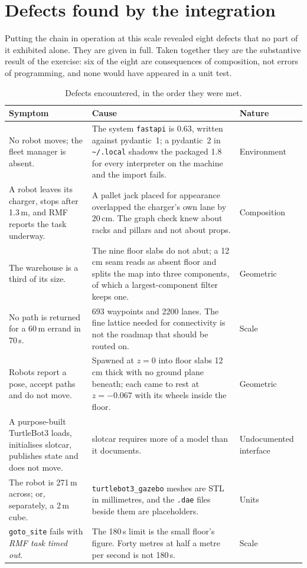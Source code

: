 \documentclass[11pt,a4paper]{article}
\theoremstyle{definition}
\newcommand{\code}[1]{\texttt{\small #1}}
\begin{document}
\section{Defects found by the integration}
\label{sec:defects}

Putting the chain in operation at this scale revealed eight defects that no
part of it exhibited alone. They are given in full. Taken together they are the substantive result of the exercise: six of the eight are consequences of composition, not errors of programming, and none would
have appeared in a unit test.

\begin{table}[H]
\centering\small
\caption{Defects encountered, in the order they were met.}
\label{tab:defects}
\begin{tabularx}{\textwidth}{@{}p{3.5cm}Xl@{}}
\toprule
\textbf{Symptom} & \textbf{Cause} & \textbf{Nature} \\
\midrule
No robot moves; the fleet manager is absent. &
The system \code{fastapi} is 0.63, written against pydantic~1; a pydantic~2 in
\code{\textasciitilde/.local} shadows the packaged 1.8 for every interpreter on
the machine and the import fails. &
Environment \\
\addlinespace
A robot leaves its charger, stops after 1.3\,m, and RMF reports the task
underway. &
A pallet jack placed for appearance overlapped the charger's own lane by
20\,cm. The graph check knew about racks and pillars and not about props. &
Composition \\
\addlinespace
The warehouse is a third of its size. &
The nine floor slabs do not abut; a 12\,cm seam reads as absent floor and
splits the map into three components, of which a largest-component filter keeps
one. &
Geometric \\
\addlinespace
No path is returned for a 60\,m errand in 70\,s. &
693 waypoints and 2200 lanes. The fine lattice needed for connectivity is not
the roadmap that should be routed on. &
Scale \\
\addlinespace
Robots report a pose, accept paths and do not move. &
Spawned at $z=0$ into floor slabs 12\,cm thick with no ground plane beneath;
each came to rest at $z=-0.067$ with its wheels inside the floor. &
Geometric \\
\addlinespace
A purpose-built TurtleBot3 loads, initialises slotcar, publishes state and does
not move. &
slotcar requires more of a model than it documents. &
Undocumented interface \\
\addlinespace
The robot is 271\,m across; or, separately, a 2\,m cube. &
\code{turtlebot3\_gazebo} meshes are STL in millimetres, and the \code{.dae}
files beside them are placeholders. &
Units \\
\addlinespace
\code{goto\_site} fails with \emph{RMF task timed out}. &
The 180\,s limit is the small floor's figure. Forty metres at half a metre per
second is not 180\,s. &
Scale \\
\bottomrule
\end{tabularx}
\end{table}
\end{document}
